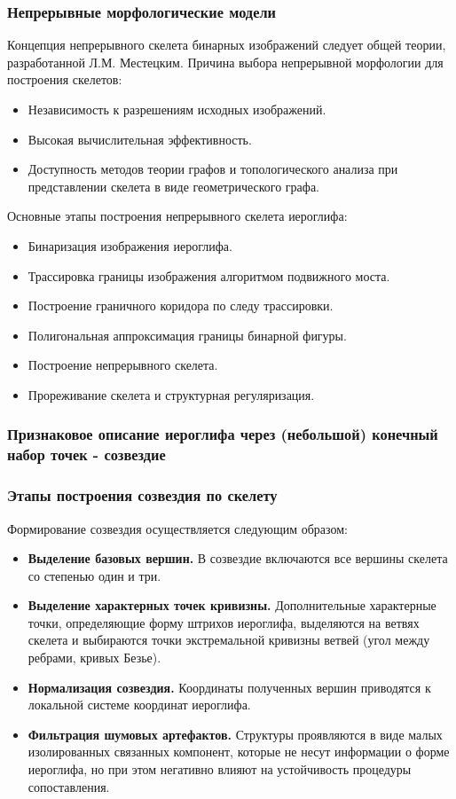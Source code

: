 \begin{frame}
    \frametitle{Непрерывные морфологические модели}
    Концепция непрерывного скелета бинарных изображений следует общей теории, разработанной Л.М. Местецким. Причина выбора непрерывной морфологии для построения скелетов:
    \begin{itemize}
        \item Независимость к разрешениям исходных изображений.
        \item Высокая вычислительная эффективность.
        \item Доступность методов теории графов и топологического анализа при представлении скелета в виде геометрического графа.
    \end{itemize}

    Основные этапы построения непрерывного скелета иероглифа:
    \begin{itemize}
        \item Бинаризация изображения иероглифа.
        \item Трассировка границы изображения алгоритмом подвижного моста.
        \item Построение граничного коридора по следу трассировки.
        \item Полигональная аппроксимация границы бинарной фигуры.
        \item Построение непрерывного скелета.
        \item Прореживание скелета и структурная регуляризация.
    \end{itemize}
\end{frame}


\subsubsection{Признаковое описание иероглифа через (небольшой) конечный набор точек - созвездие}

\begin{frame}
    \frametitle{Этапы построения созвездия по скелету}
    Формирование созвездия осуществляется следующим образом:
    \begin{itemize}
        \item \textbf{Выделение базовых вершин.} В созвездие включаются все вершины скелета со степенью один и три.
        \item \textbf{Выделение характерных точек кривизны.} Дополнительные характерные точки, определяющие форму штрихов иероглифа, выделяются на ветвях скелета и выбираются точки экстремальной кривизны ветвей (угол между ребрами, кривых Безье).
        \item \textbf{Нормализация созвездия.} Координаты полученных вершин приводятся к локальной системе координат иероглифа.
        \item \textbf{Фильтрация шумовых артефактов.} Структуры проявляются в виде малых изолированных связанных компонент, которые не несут информации о форме иероглифа, но при этом негативно влияют на устойчивость процедуры сопоставления.
    \end{itemize}
\end{frame}

